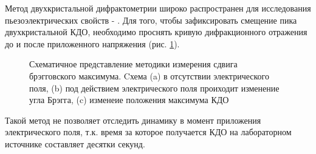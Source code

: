 Метод двухкристальной дифрактометрии широко распространен для исследования пьезоэлектрических свойств \cite{piezo51} - \cite{piezo54}.
Для того, чтобы зафиксировать смещение пика двухкристальной КДО, необходимо проснять кривую дифракционного отражения
до и после приложенного напряжения (рис. \ref{ris:piezo_classic}).
\begin{figure}[H]
  \centering
  \hfill
  \hfill

  \caption{Схематичное представление методики измерения сдвига брэгговского максимума. Cхема
  (a) в отсутствии электрического поля, (b)  под действием электрического поля проиходит изменение угла
  Брэгга, (c) изменеие положения максимума КДО}
  \label{ris:piezo_classic}
\end{figure}
  Такой метод не позволяет отследить динамику в момент приложения электрического поля,
  т.к. время за которое получается КДО на лабораторном источнике составляет десятки секунд.
